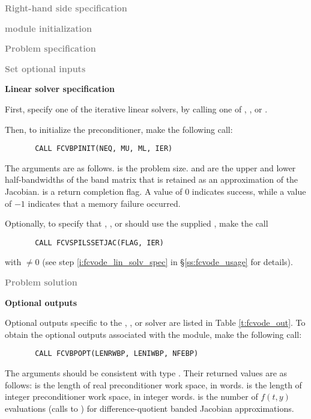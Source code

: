 \begin{Steps}
  
\item \textcolor{gray}{\bf Right-hand side specification}

\item \textcolor{gray}{\bf {\nvector} module initialization}

\item \textcolor{gray}{\bf Problem specification}

\item \textcolor{gray}{\bf Set optional inputs}

\item {\bf Linear solver specification}

  First, specify one of the {\cvspils} iterative linear solvers, by calling
  one of , , or .

  Then, to initialize the {\cvbandpre} preconditioner, make the following call:
\begin{verbatim}
       CALL FCVBPINIT(NEQ, MU, ML, IER)
\end{verbatim}
  The arguments are as follows.
   is the problem size.
   and  are the upper and lower half-bandwidths of the band matrix
  that  is retained as an approximation of the Jacobian.
   is a return completion flag.  A value of $0$ indicates success, while 
  a value of $-1$ indicates that a memory failure occurred.
    
  Optionally, to specify that {\spgmr}, {\spbcg}, or {\sptfqmr} should use 
  the supplied , make the call
\begin{verbatim}
       CALL FCVSPILSSETJAC(FLAG, IER)
\end{verbatim}
  with  $\neq 0$ 
  (see step \ref{i:fcvode_lin_solv_spec} in \S\ref{ss:fcvode_usage} for details).
  
\item \textcolor{gray}{\bf Problem solution}
  
\item {\bf {\cvbandpre} Optional outputs}
  
  Optional outputs specific to the {\spgmr}, {\spbcg}, or {\sptfqmr} solver are 
  listed in Table \ref{t:fcvode_out}.
  To obtain the optional outputs associated with the {\cvbandpre} module, make
  the following call:
\begin{verbatim}
       CALL FCVBPOPT(LENRWBP, LENIWBP, NFEBP)
\end{verbatim}
  The arguments should be consistent with {\C} type .  Their
  returned values are as follows:
   is the length of real preconditioner work space, in 
  words.  is the length of integer preconditioner work space, in
  integer words.  is the number of $f(t,y)$ evaluations (calls to
  ) for difference-quotient banded Jacobian approximations.
  

\end{Steps}
